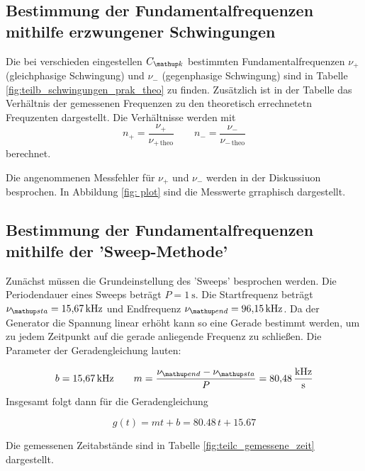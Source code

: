 \subsection{Bestimmung der Fundamentalfrequenzen mithilfe erzwungener Schwingungen}
Die bei verschieden eingestellen $C\ua{k}$ bestimmten Fundamentalfrequenzen 
$\nu_+$ (gleichphasige Schwingung) und $\nu_-$ (gegenphasige Schwingung)
sind in Tabelle \ref{fig:teilb_schwingungen_prak_theo} zu finden.
Zusätzlich ist in der Tabelle das Verhältnis der gemessenen Frequenzen 
zu den theoretisch errechnetetn Frequzenten dargestellt.
Die Verhältnisse werden mit
\begin{equation}
\label{eq:verh}
n_+=\frac{\nu_+}{\nu_{+\,\mathup{theo}}} \qquad n_-=\frac{\nu_-}{\nu_{-\,\mathup{theo}}}
\end{equation}
berechnet.
\FloatBarrier

\FloatBarrier
Die angenommenen Messfehler für $\nu_+$ und $\nu_-$ werden in der Diskussiuon besprochen.
In Abbildung \ref{fig: plot} sind die Messwerte grraphisch dargestellt.

\subsection{Bestimmung der Fundamentalfrequenzen mithilfe der 'Sweep-Methode'}
Zunächst müssen die Grundeinstellung des 'Sweeps' besprochen werden.
Die Periodendauer eines Sweeps beträgt $P=\SI{1}{\second}$.
Die Startfrequenz beträgt $\nu\ua{sta}=\SI{15.67}{\kilo\hertz}$ und 
Endfrequenz $\nu\ua{end}=\SI{96.15}{\kilo\hertz}$.
Da der Generator die Spannung linear erhöht kann so eine Gerade bestimmt werden, um 
zu jedem Zeitpunkt auf die gerade anliegende Frequenz zu schließen.
Die Parameter der Geradengleichung lauten:

\begin{equation*}
b=\SI{15.67}{\kilo\hertz} \qquad m=\frac{\nu\ua{end}-\nu\ua{sta}}{P}=\SI{80.48}{\kilo\hertz\per\second}
\end{equation*}
Insgesamt folgt dann für die Geradengleichung

\begin{equation}
\label{eq:geraden}
g(t)=mt+b=80.48\,t+15.67
\end{equation}

Die gemessenen Zeitabstände sind in Tabelle \ref{fig:teilc_gemessene_zeit} dargestellt.


